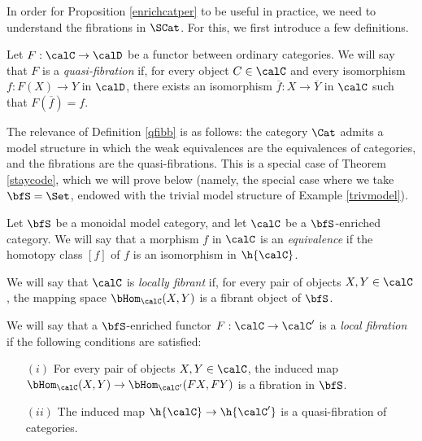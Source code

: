 In order for Proposition \ref{enrichcatper} to be useful in practice, we need to understand the fibrations in $\SCat$. For this, we first introduce a few definitions.

\begin{definition}\label{qfibb}
Let $F: \calC \rightarrow \calD$ be a functor between ordinary categories. We will say that
$F$ is a {\it quasi-fibration} if, for every object $C \in \calC$ and every isomorphism
$f: F(X) \rightarrow Y$ in $\calD$, there exists an isomorphism $\overline{f}: X \rightarrow \overline{Y}$ in $\calC$ such that $F( \overline{f} ) = f$.
\end{definition}

\begin{remark}
The relevance of Definition \ref{qfibb} is as follows: the category $\Cat$ admits a model structure
in which the weak equivalences are the equivalences of categories, and the fibrations are the quasi-fibrations. This is a special case of Theorem \ref{staycode}, which we will prove below
(namely, the special case where we take $\bfS = \Set$, endowed with the trivial model
structure of Example \ref{trivmodel}). 
\end{remark}

\begin{definition}\label{twurp}
Let $\bfS$ be a monoidal model category, and let $\calC$ be a
$\bfS$-enriched category. We will say that a morphism $f$
in $\calC$ is an {\it equivalence} if the homotopy class $[f]$
of $f$ is an isomorphism in $\h{\calC}$.

We will say that $\calC$ is {\it locally fibrant} if, for every pair of objects
$X,Y \in \calC$, the mapping space $\bHom_{\calC}(X,Y)$ is a fibrant object
of $\bfS$.

We will say that a $\bfS$-enriched functor $F: \calC \rightarrow \calC'$ is a
{\it local fibration} if the following conditions are satisfied:
\begin{itemize}
\item[$(i)$] For every pair of objects
$X,Y \in \calC$, the induced map $\bHom_{\calC}(X,Y) \rightarrow
\bHom_{\calC'}(FX,FY)$ is a fibration in $\bfS$. 
\item[$(ii)$] The induced map $\h{\calC} \rightarrow \h{\calC'}$ is a quasi-fibration
of categories.
\end{itemize}
\end{definition}

